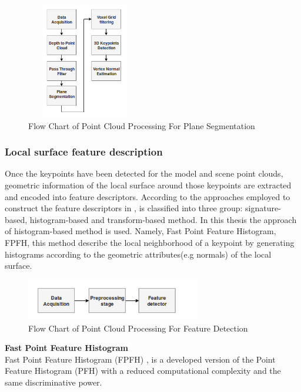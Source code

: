 \begin{figure}[!h]
\begin{center}
\includegraphics[width=2in,height=2in]{diagrams/vertexnormal.png}
\caption{Flow Chart of Point Cloud Processing For Plane Segmentation}
\label{fig:planesegmentation}
\end{center}
\end{figure}
\subsubsection{Local surface feature description}

Once the keypoints have been detected for the model and scene point clouds, geometric information of the local surface around those keypoints are extracted and encoded into feature descriptors. According to the approaches employed to construct the feature descriptors in \cite{survey}, is classified into three group: signature-based, histogram-based and transform-based method. In this thesis the approach of histogram-based method is used. Namely, Fast Point Feature Histogram, FPFH, this method describe the local neighborhood of a keypoint by generating histograms according to the geometric attributes(e.g normals) of the local surface.

\begin{figure}[!h]
\begin{center}
\includegraphics[width=3in]{diagrams/fpfh.png}
\caption{Flow Chart of Point Cloud Processing For Feature Detection}
\label{fig:fpfh}
\end{center}
\end{figure}

\noindent
\textbf{Fast Point Feature Histogram}\\
Fast Point Feature Histogram (FPFH) \cite{algFpfh}, is a developed version of the Point Feature Histogram (PFH) \cite{algFpfh} with a reduced computational complexity and the same discriminative power. 

